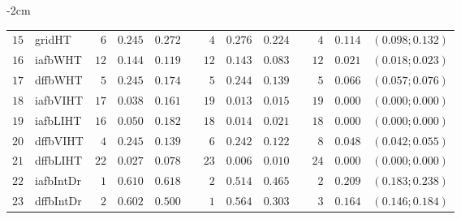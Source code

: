\begin{table*}[!htbp]
\begin{adjustwidth*}{}{-2cm}
\begin{tabular}{@{}rlrrrrrrrrrcc@{}}
\footnotesize{$15$} & \footnotesize{gridHT   } & \footnotesize{$6 $} & \footnotesize{$0.245$} & \footnotesize{$0.272$} && \footnotesize{$4 $} & \footnotesize{$0.276$} & \footnotesize{$0.224$} && \footnotesize{$4 $} & \footnotesize{$0.114$} & \footnotesize{$(0.098;0.132)$} \\
\footnotesize{$16$} & \footnotesize{iafbWHT  } & \footnotesize{$12$} & \footnotesize{$0.144$} & \footnotesize{$0.119$} && \footnotesize{$12$} & \footnotesize{$0.143$} & \footnotesize{$0.083$} && \footnotesize{$12$} & \footnotesize{$0.021$} & \footnotesize{$(0.018;0.023)$} \\
\footnotesize{$17$} & \footnotesize{dffbWHT  } & \footnotesize{$5 $} & \footnotesize{$0.245$} & \footnotesize{$0.174$} && \footnotesize{$5 $} & \footnotesize{$0.244$} & \footnotesize{$0.139$} && \footnotesize{$5 $} & \footnotesize{$0.066$} & \footnotesize{$(0.057;0.076)$} \\
\footnotesize{$18$} & \footnotesize{iafbVIHT } & \footnotesize{$17$} & \footnotesize{$0.038$} & \footnotesize{$0.161$} && \footnotesize{$19$} & \footnotesize{$0.013$} & \footnotesize{$0.015$} && \footnotesize{$19$} & \footnotesize{$0.000$} & \footnotesize{$(0.000;0.000)$} \\
\footnotesize{$19$} & \footnotesize{iafbLIHT } & \footnotesize{$16$} & \footnotesize{$0.050$} & \footnotesize{$0.182$} && \footnotesize{$18$} & \footnotesize{$0.014$} & \footnotesize{$0.021$} && \footnotesize{$18$} & \footnotesize{$0.000$} & \footnotesize{$(0.000;0.000)$} \\
\footnotesize{$20$} & \footnotesize{dffbVIHT } & \footnotesize{$4 $} & \footnotesize{$0.245$} & \footnotesize{$0.139$} && \footnotesize{$6 $} & \footnotesize{$0.242$} & \footnotesize{$0.122$} && \footnotesize{$8 $} & \footnotesize{$0.048$} & \footnotesize{$(0.042;0.055)$} \\
\footnotesize{$21$} & \footnotesize{dffbLIHT } & \footnotesize{$22$} & \footnotesize{$0.027$} & \footnotesize{$0.078$} && \footnotesize{$23$} & \footnotesize{$0.006$} & \footnotesize{$0.010$} && \footnotesize{$24$} & \footnotesize{$0.000$} & \footnotesize{$(0.000;0.000)$} \\
\footnotesize{$22$} & \footnotesize{iafbIntDr} & \footnotesize{$1 $} & \footnotesize{$0.610$} & \footnotesize{$0.618$} && \footnotesize{$2 $} & \footnotesize{$0.514$} & \footnotesize{$0.465$} && \footnotesize{$2 $} & \footnotesize{$0.209$} & \footnotesize{$(0.183;0.238)$} \\
\footnotesize{$23$} & \footnotesize{dffbIntDr} & \footnotesize{$2 $} & \footnotesize{$0.602$} & \footnotesize{$0.500$} && \footnotesize{$1 $} & \footnotesize{$0.564$} & \footnotesize{$0.303$} && \footnotesize{$3 $} & \footnotesize{$0.164$} & \footnotesize{$(0.146;0.184)$} \\

\end{tabular}
\end{adjustwidth*}
\end{table*}

